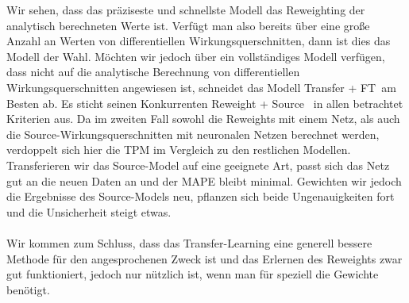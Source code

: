 Wir sehen, dass das präziseste und schnellste Modell das Reweighting der analytisch berechneten Werte ist. Verfügt man also bereits über eine große Anzahl an Werten von differentiellen Wirkungsquerschnitten, dann ist dies das Modell der Wahl. Möchten wir jedoch über ein vollständiges Modell verfügen, dass nicht auf die analytische Berechnung von differentiellen Wirkungsquerschnitten angewiesen ist, schneidet das Modell \glqq Transfer + FT\grqq~am Besten ab. Es sticht seinen Konkurrenten \glqq Reweight + Source\grqq~ in allen betrachtet Kriterien aus. Da im zweiten Fall sowohl die Reweights mit einem Netz, als auch die Source-Wirkungsquerschnitten mit neuronalen Netzen berechnet werden, verdoppelt sich hier die TPM im Vergleich zu den restlichen Modellen. Transferieren wir das Source-Model auf eine geeignete Art, passt sich das Netz gut an die neuen Daten an und der MAPE bleibt minimal. Gewichten wir jedoch die Ergebnisse des Source-Models neu, pflanzen sich beide Ungenauigkeiten fort und die Unsicherheit steigt etwas. \\
\\
Wir kommen zum Schluss, dass das Transfer-Learning eine generell bessere Methode für den angesprochenen Zweck ist und das Erlernen des Reweights zwar gut funktioniert, jedoch nur nützlich ist, wenn man für speziell die Gewichte benötigt.
